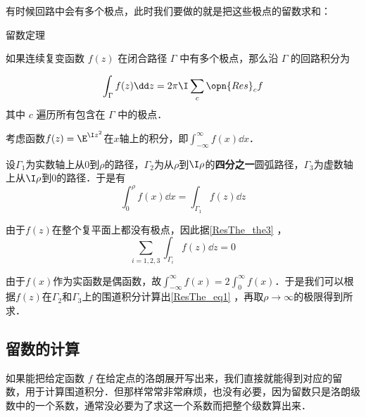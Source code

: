 有时候回路中会有多个极点，此时我们要做的就是把这些极点的留数求和：

\begin{theorem}{留数定理}\label{ResThe_the3}

如果连续复变函数 $f(z)$ 在闭合路径 $\Gamma$ 中有多个极点，那么沿 $\Gamma$ 的回路积分为

\begin{equation}
\int_\Gamma f(z)\dd z=2\pi\I\sum_{c}\opn{Res}_cf
\end{equation}
其中 $c$ 遍历所有包含在 $\Gamma$ 中的极点．


\end{theorem}



\begin{example}{}

考虑函数$f(z)=\E^{\I z^2}$在$x$轴上的积分，即$\int^\infty_{-\infty} f(x) \dd x$．

设$\Gamma_1$为实数轴上从$0$到$\rho$的路径，$\Gamma_2$为从$\rho$到$\I \rho$的\textbf{四分之一}圆弧路径，$\Gamma_3$为虚数轴上从$\I\rho$到$0$的路径．于是有
\begin{equation}
\int^\rho_{0} f(x) \dd x = \int_{\Gamma_1}f(z)\dd z
\end{equation}

由于$f(z)$在整个复平面上都没有极点，因此据\autoref{ResThe_the3} ，
\begin{equation}
\sum_{i=1, 2, 3}\int_{\Gamma_i} f(z) \dd z = 0
\end{equation}

由于$f(x)$作为实函数是偶函数，故$\int^\infty_{-\infty} f(x)=2\int^\infty_0 f(x)$．于是我们可以根据$f(z)$在$\Gamma_2$和$\Gamma_3$上的围道积分计算出\autoref{ResThe_eq1} ，再取$\rho\to\infty$的极限得到所求．







\end{example}









\subsection{留数的计算}



如果能把给定函数 $f$ 在给定点的洛朗展开写出来，我们直接就能得到对应的留数，用于计算围道积分．但那样常常非常麻烦，也没有必要，因为留数只是洛朗级数中的一个系数，通常没必要为了求这一个系数而把整个级数算出来．

